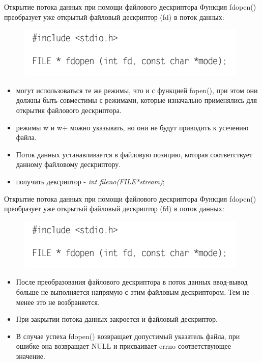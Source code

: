 \documentclass{beamer}
\begin{document}
\begin{frame}{Открытие потока данных при помощи файлового дескриптора}
Функция fdopen() преобразует уже открытый файловый дескриптор (fd) в поток данных:
\begin{figure}[h]
\centering
\includegraphics[scale=0.5]{images/lec05-pic06.png}
\end{figure}
\begin{itemize}
\item могут использоваться те же режимы, что и с функцией fopen(), при этом они должны быть совместимы с режимами, которые изначально применялись для открытия файлового дескриптора. 
\item режимы w и w+ можно указывать, но они не будут приводить к усечению файла. 
\item Поток данных устанавливается в файловую позицию, которая соответствует данному файловому дескриптору.
\item получить дексриптор - \textit{int fileno(FILE*stream)};
\end{itemize}
\end{frame}

\begin{frame}{Открытие потока данных при помощи файлового дескриптора}
Функция fdopen() преобразует уже открытый файловый дескриптор (fd) в поток данных:
\begin{figure}[h]
\centering
\includegraphics[scale=0.5]{images/lec05-pic06.png}
\end{figure}
\begin{itemize}
\item После преобразования файлового дескриптора в поток данных ввод-вывод больше не выполняется напрямую с этим файловым дескриптором. Тем не менее это не возбраняется. 
\item При закрытии потока данных закроется и файловый дескриптор.
\item В случае успеха fdopen() возвращает допустимый указатель файла, при ошибке она возвращает NULL и присваивает errno соответствующее значение.
\end{itemize}
\end{frame}
\end{document}

